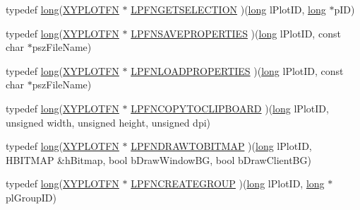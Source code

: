 \begin{DoxyCompactItemize}
\item 
typedef \hyperlink{namespacexyplot_a27bc71b0bdfac09495e7e531d8a918c5}{long}(\hyperlink{_x_y_plot_wrapper_8h_aba6cc8b3b62f2540637745c385e17016}{X\-Y\-P\-L\-O\-T\-F\-N} $\ast$ \hyperlink{namespacexyplot_accdc65e18386127090607d48d4d6ef55}{L\-P\-F\-N\-G\-E\-T\-S\-E\-L\-E\-C\-T\-I\-O\-N} )(\hyperlink{namespacexyplot_a27bc71b0bdfac09495e7e531d8a918c5}{long} l\-Plot\-I\-D, \hyperlink{namespacexyplot_a27bc71b0bdfac09495e7e531d8a918c5}{long} $\ast$p\-I\-D)
\item 
typedef \hyperlink{namespacexyplot_a27bc71b0bdfac09495e7e531d8a918c5}{long}(\hyperlink{_x_y_plot_wrapper_8h_aba6cc8b3b62f2540637745c385e17016}{X\-Y\-P\-L\-O\-T\-F\-N} $\ast$ \hyperlink{namespacexyplot_a097f19903e90904e363a37bd0418d16b}{L\-P\-F\-N\-S\-A\-V\-E\-P\-R\-O\-P\-E\-R\-T\-I\-E\-S} )(\hyperlink{namespacexyplot_a27bc71b0bdfac09495e7e531d8a918c5}{long} l\-Plot\-I\-D, const char $\ast$psz\-File\-Name)
\item 
typedef \hyperlink{namespacexyplot_a27bc71b0bdfac09495e7e531d8a918c5}{long}(\hyperlink{_x_y_plot_wrapper_8h_aba6cc8b3b62f2540637745c385e17016}{X\-Y\-P\-L\-O\-T\-F\-N} $\ast$ \hyperlink{namespacexyplot_a5fcef3c2ef35e0f543cb6e0489566a41}{L\-P\-F\-N\-L\-O\-A\-D\-P\-R\-O\-P\-E\-R\-T\-I\-E\-S} )(\hyperlink{namespacexyplot_a27bc71b0bdfac09495e7e531d8a918c5}{long} l\-Plot\-I\-D, const char $\ast$psz\-File\-Name)
\item 
typedef \hyperlink{namespacexyplot_a27bc71b0bdfac09495e7e531d8a918c5}{long}(\hyperlink{_x_y_plot_wrapper_8h_aba6cc8b3b62f2540637745c385e17016}{X\-Y\-P\-L\-O\-T\-F\-N} $\ast$ \hyperlink{namespacexyplot_a64a77ea08258ed9ffc0bf7ffda3da7a4}{L\-P\-F\-N\-C\-O\-P\-Y\-T\-O\-C\-L\-I\-P\-B\-O\-A\-R\-D} )(\hyperlink{namespacexyplot_a27bc71b0bdfac09495e7e531d8a918c5}{long} l\-Plot\-I\-D, unsigned width, unsigned height, unsigned dpi)
\item 
typedef \hyperlink{namespacexyplot_a27bc71b0bdfac09495e7e531d8a918c5}{long}(\hyperlink{_x_y_plot_wrapper_8h_aba6cc8b3b62f2540637745c385e17016}{X\-Y\-P\-L\-O\-T\-F\-N} $\ast$ \hyperlink{namespacexyplot_abe5bcbe4527096dba3cee83119449785}{L\-P\-F\-N\-D\-R\-A\-W\-T\-O\-B\-I\-T\-M\-A\-P} )(\hyperlink{namespacexyplot_a27bc71b0bdfac09495e7e531d8a918c5}{long} l\-Plot\-I\-D, H\-B\-I\-T\-M\-A\-P \&h\-Bitmap, bool b\-Draw\-Window\-B\-G, bool b\-Draw\-Client\-B\-G)
\item 
typedef \hyperlink{namespacexyplot_a27bc71b0bdfac09495e7e531d8a918c5}{long}(\hyperlink{_x_y_plot_wrapper_8h_aba6cc8b3b62f2540637745c385e17016}{X\-Y\-P\-L\-O\-T\-F\-N} $\ast$ \hyperlink{namespacexyplot_ab1a3054ba818e5b40da27a562af9714c}{L\-P\-F\-N\-C\-R\-E\-A\-T\-E\-G\-R\-O\-U\-P} )(\hyperlink{namespacexyplot_a27bc71b0bdfac09495e7e531d8a918c5}{long} l\-Plot\-I\-D, \hyperlink{namespacexyplot_a27bc71b0bdfac09495e7e531d8a918c5}{long} $\ast$pl\-Group\-I\-D)

\end{DoxyCompactItemize}
